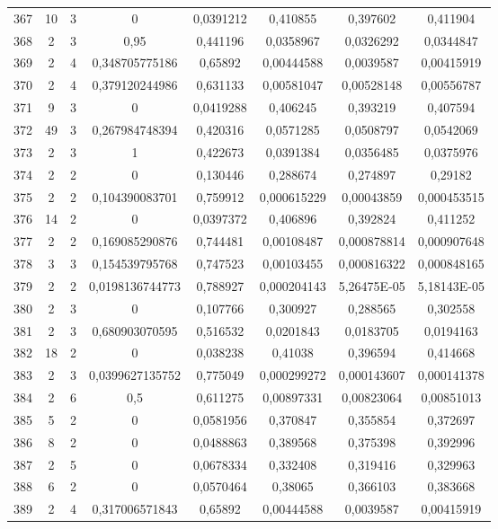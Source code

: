 \begin{longtable}{|c|c|c|c|c|c|c|c|}
367 & 10 & 3 & 0 & 0,0391212 & 0,410855 & 0,397602 & 0,411904  \\
368 & 2 & 3 & 0,95 & 0,441196 & 0,0358967 & 0,0326292 & 0,0344847  \\
369 & 2 & 4 & 0,348705775186 & 0,65892 & 0,00444588 & 0,0039587 & 0,00415919  \\
370 & 2 & 4 & 0,379120244986 & 0,631133 & 0,00581047 & 0,00528148 & 0,00556787  \\
371 & 9 & 3 & 0 & 0,0419288 & 0,406245 & 0,393219 & 0,407594  \\
372 & 49 & 3 & 0,267984748394 & 0,420316 & 0,0571285 & 0,0508797 & 0,0542069  \\
373 & 2 & 3 & 1 & 0,422673 & 0,0391384 & 0,0356485 & 0,0375976  \\
374 & 2 & 2 & 0 & 0,130446 & 0,288674 & 0,274897 & 0,29182  \\
375 & 2 & 2 & 0,104390083701 & 0,759912 & 0,000615229 & 0,00043859 & 0,000453515  \\
376 & 14 & 2 & 0 & 0,0397372 & 0,406896 & 0,392824 & 0,411252  \\
377 & 2 & 2 & 0,169085290876 & 0,744481 & 0,00108487 & 0,000878814 & 0,000907648  \\
378 & 3 & 3 & 0,154539795768 & 0,747523 & 0,00103455 & 0,000816322 & 0,000848165  \\
379 & 2 & 2 & 0,0198136744773 & 0,788927 & 0,000204143 & 5,26475E-05 & 5,18143E-05  \\
380 & 2 & 3 & 0 & 0,107766 & 0,300927 & 0,288565 & 0,302558  \\
381 & 2 & 3 & 0,680903070595 & 0,516532 & 0,0201843 & 0,0183705 & 0,0194163  \\
382 & 18 & 2 & 0 & 0,038238 & 0,41038 & 0,396594 & 0,414668  \\
383 & 2 & 3 & 0,0399627135752 & 0,775049 & 0,000299272 & 0,000143607 & 0,000141378  \\
384 & 2 & 6 & 0,5 & 0,611275 & 0,00897331 & 0,00823064 & 0,00851013  \\
385 & 5 & 2 & 0 & 0,0581956 & 0,370847 & 0,355854 & 0,372697  \\
386 & 8 & 2 & 0 & 0,0488863 & 0,389568 & 0,375398 & 0,392996  \\
387 & 2 & 5 & 0 & 0,0678334 & 0,332408 & 0,319416 & 0,329963  \\
388 & 6 & 2 & 0 & 0,0570464 & 0,38065 & 0,366103 & 0,383668  \\
389 & 2 & 4 & 0,317006571843 & 0,65892 & 0,00444588 & 0,0039587 & 0,00415919  \\

\end{longtable}

